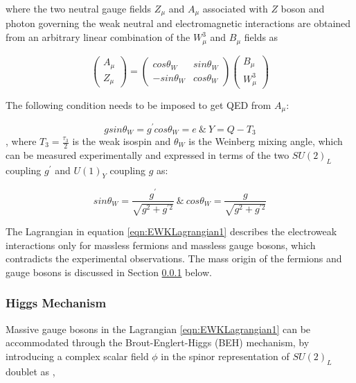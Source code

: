 where the two neutral gauge fields $Z_{\mu}$ and $A_{\mu}$ associated with $Z$ boson and photon governing the weak neutral and electromagnetic interactions are obtained from an arbitrary linear combination of the $W^{3}_{\mu}$ and $B_{\mu}$ fields as 

\begin{equation}
\begin{pmatrix} A_{\mu} \\ Z_{\mu} \end{pmatrix} =  \begin{pmatrix} cos{\theta_{W}} & sin{\theta_{W}} \\ -sin{\theta_{W}} & cos{\theta_{W}} \end{pmatrix} \begin{pmatrix} B_{\mu} \\ W^{3}_{\mu} \end{pmatrix}
\label{eqn:NeutralGaugeBosons}
\end{equation}


The following condition needs to be imposed to get QED from $A_{\mu}$:

\begin{equation}
g sin\theta_{W} = g^{'} cos\theta_{W} = e ~\& ~  Y= Q - T_{3}
\label{eqn:QEDFromEWk}
\end{equation}
, where $T_{3}=\frac{\tau_{3}}{2}$ is the weak isospin and $\theta_{W}$ is the Weinberg mixing angle, which can be measured experimentally and expressed in terms of the two $SU(2)_{L}$ coupling $g^{'}$ and $U(1)_{Y}$ coupling $g$ as:

\begin{equation}
sin\theta_{W} = \frac{g^{'}}{\sqrt{g^{2} +  g^{'2} }} ~\&~ cos\theta_{W} = \frac{g}{\sqrt{g^{2} +  g^{'2} }}
\label{eqn:WeinbergAngle}
\end{equation}

The Lagrangian in equation \ref{eqn:EWKLagrangian1} describes the electroweak interactions only for massless fermions and massless gauge bosons, which contradicts the experimental observations. The mass origin of the fermions and gauge bosons is discussed in Section \ref{subsubsec:HiggsMech} below. 

\subsubsection{Higgs Mechanism}
\label{subsubsec:HiggsMech}

Massive gauge bosons in the Lagrangian \ref{eqn:EWKLagrangian1} can be accommodated through the Brout-Englert-Higgs (BEH) mechanism, by introducing a complex scalar field $\phi$ in the spinor representation of $SU(2)_{L}$ doublet as \cite{HiggsMechanism},

